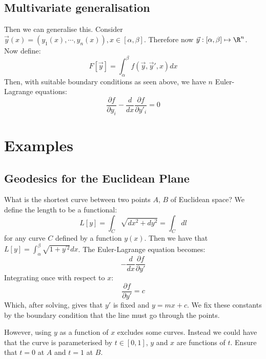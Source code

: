 \documentclass[../Main.tex]{subfiles}
\begin{document}
\subsection{Multivariate generalisation}
Then we can generalise this. Consider $\vec{y}(x) = (y_1(x), \cdots, y_n(x)), x \in [\alpha, \beta]$. Therefore now $\vec{y} : [\alpha, \beta] \mapsto \R^n$. Now define:
\begin{equation*}
    F[\vec{y}] = \int_\alpha^\beta f(\vec{y}, \vec{y}', x) dx
\end{equation*}
Then, with suitable boundary conditions as seen above, we have $n$ Euler-Lagrange equations:
\begin{equation}
    \frac{\partial f}{\partial y_i} - \frac{d}{dx} \frac{\partial f}{\partial y'_i} = 0
    \label{eqnMultivariateEulerLagrange}
\end{equation}
\section{Examples}
\subsection{Geodesics for the Euclidean Plane}
What is the shortest curve between two points $A$, $B$ of Euclidean space? We define the length to be a functional:
\begin{equation*}
    L[y] = \int_C \sqrt{dx^2 + dy^2} = \int_C dl
\end{equation*}
for any curve $C$ defined by a function $y(x)$.
Then we have that $L[y] = \int_\alpha^\beta \sqrt{1 + y^{\prime 2}}dx$. The Euler-Lagrange equation becomes:
\begin{equation*}
    -\frac{d}{dx} \frac{\partial f}{\partial y'}
\end{equation*}
Integrating once with respect to $x$:
\begin{equation*}
    \frac{\partial f}{\partial y'} = c
\end{equation*}
Which, after solving, gives that $y'$ is fixed and $y = mx + c$. We fix these constants by the boundary condition that the line must go through the points.

However, using $y$ as a function of $x$ excludes some curves. Instead we could have that the curve is parameterised by $t \in [0, 1]$, $y$ and $x$ are functions of $t$. Ensure that $t = 0$ at $A$ and $t = 1$ at $B$.
\end{document}

